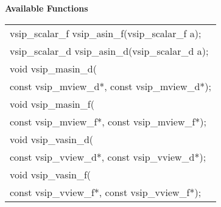 \cvsiplh
\newline \hspace*{.8cm} \vspace*{.1cm} \textbf{Available Functions }
\newline \hspace*{1.1cm} {
\ttfamily
\begin{tabular}[H]{l}
vsip\_scalar\_f vsip\_asin\_f(vsip\_scalar\_f a);\\
vsip\_scalar\_d vsip\_asin\_d(vsip\_scalar\_d a);\\
void vsip\_masin\_d(\\*
\hspace{1cm}const vsip\_mview\_d*, const vsip\_mview\_d*);\\
void vsip\_masin\_f(\\*
\hspace{1cm}const vsip\_mview\_f*, const vsip\_mview\_f*);\\
void vsip\_vasin\_d(\\*
\hspace{1cm}const vsip\_vview\_d*, const vsip\_vview\_d*);\\
void vsip\_vasin\_f(\\*
\hspace{1cm}const vsip\_vview\_f*, const vsip\_vview\_f*);\\
\end{tabular}
}
\pyjvsiph
{}
